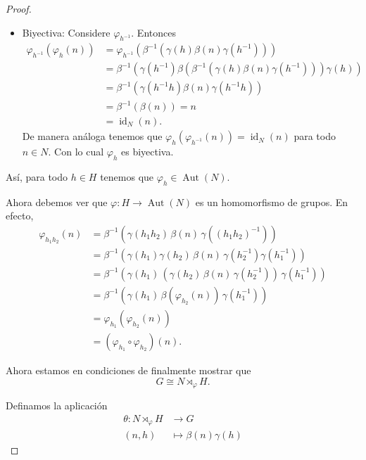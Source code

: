 \begin{proof}
\begin{itemize}
		\item Biyectiva: Considere $\varphi_{h^{-1}}$. Entonces 
		\begin{align*}
			\varphi_{h^{-1}}\left(\varphi_h(n)\right)&=\varphi_{h^{-1}} \left(\beta^{-1}\left(\gamma(h)\beta(n)\gamma(h^{-1})\right)\right)\\[4pt]
			&=\beta^{-1}\left(\gamma(h^{-1})\beta\left(\beta^{-1}\left(\gamma(h)\beta(n)\gamma(h^{-1})\right)\right)\gamma(h)\right)\\[4pt]
			&=\beta^{-1}\left(\gamma(h^{-1}h)\beta(n)\gamma(h^{-1}h)\right)\\[4pt]
			&=\beta^{-1}(\beta(n))=n\\[4pt]
			&=\operatorname{id}_N(n).
		\end{align*}
		De manera análoga tenemos que $\varphi_h\left(\varphi_{h^{-1}}(n)\right)=\operatorname{id}_N(n)$ para todo $n\in N$. Con lo cual $\varphi_h$ es biyectiva.
	\end{itemize}
	Así, para todo $h\in H$ tenemos que $\varphi_h \in\operatorname{Aut}(N)$.
	
	\medskip
	\noindent
	Ahora debemos ver que $\varphi: H\to \operatorname{Aut}(N)$ es un homomorfismo de grupos. En efecto,
	\begin{align*}
		\varphi_{h_1 h_2}(n) 
		&= \beta^{-1}\left( \gamma(h_1 h_2)\, \beta(n)\, \gamma\left((h_1 h_2)^{-1}\right) \right) \\[4pt]
		&= \beta^{-1}\left( \gamma(h_1)\gamma(h_2)\, \beta(n)\, \gamma\left(h_2^{-1}\right)\gamma\left(h_1^{-1}\right) \right) \\[4pt]
		&= \beta^{-1}\left( \gamma(h_1)\, \left( \gamma(h_2)\, \beta(n)\, \gamma\left(h_2^{-1}\right) \right)\, \gamma\left(h_1^{-1}\right) \right) \\[4pt]
		&= \beta^{-1}\left( \gamma(h_1)\, \beta\left( \varphi_{h_2}(n) \right)\, \gamma\left(h_1^{-1}\right) \right) \\[4pt]
		&= \varphi_{h_1}\left( \varphi_{h_2}(n) \right) \\[4pt]
		&= \left( \varphi_{h_1} \circ \varphi_{h_2} \right)(n).
	\end{align*}
	
	\noindent Ahora estamos en condiciones de finalmente mostrar que $$G\cong N\rtimes_\varphi H.$$
	
	\noindent
	Definamos la aplicación
	\begin{align*}
		\theta: N \rtimes_{\varphi} H &\longrightarrow G \\
		(n, h) &\longmapsto \beta(n)\gamma(h)
	\end{align*}
	

\end{proof}
